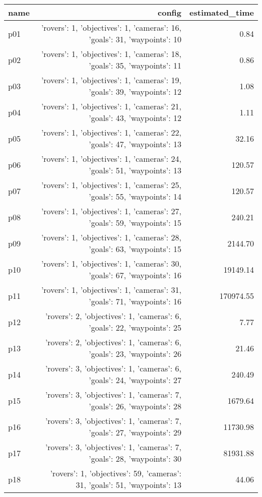 \documentclass{article}
\begin{document}
                            \begin{center}
                            \scriptsize
                            \begin{tabular}{@{}l|r|r@{}}
                            name & config & estimated\_time\\\midrule
                              p01&{'rovers': 1, 'objectives': 1, 'cameras': 16, 'goals': 31, 'waypoints': 10}&0.84\\
  p02&{'rovers': 1, 'objectives': 1, 'cameras': 18, 'goals': 35, 'waypoints': 11}&0.86\\
  p03&{'rovers': 1, 'objectives': 1, 'cameras': 19, 'goals': 39, 'waypoints': 12}&1.08\\
  p04&{'rovers': 1, 'objectives': 1, 'cameras': 21, 'goals': 43, 'waypoints': 12}&1.11\\
  p05&{'rovers': 1, 'objectives': 1, 'cameras': 22, 'goals': 47, 'waypoints': 13}&32.16\\
  p06&{'rovers': 1, 'objectives': 1, 'cameras': 24, 'goals': 51, 'waypoints': 13}&120.57\\
  p07&{'rovers': 1, 'objectives': 1, 'cameras': 25, 'goals': 55, 'waypoints': 14}&120.57\\
  p08&{'rovers': 1, 'objectives': 1, 'cameras': 27, 'goals': 59, 'waypoints': 15}&240.21\\
  p09&{'rovers': 1, 'objectives': 1, 'cameras': 28, 'goals': 63, 'waypoints': 15}&2144.70\\
  p10&{'rovers': 1, 'objectives': 1, 'cameras': 30, 'goals': 67, 'waypoints': 16}&19149.14\\
  p11&{'rovers': 1, 'objectives': 1, 'cameras': 31, 'goals': 71, 'waypoints': 16}&170974.55\\
  p12&{'rovers': 2, 'objectives': 1, 'cameras': 6, 'goals': 22, 'waypoints': 25}&7.77\\
  p13&{'rovers': 2, 'objectives': 1, 'cameras': 6, 'goals': 23, 'waypoints': 26}&21.46\\
  p14&{'rovers': 3, 'objectives': 1, 'cameras': 6, 'goals': 24, 'waypoints': 27}&240.49\\
  p15&{'rovers': 3, 'objectives': 1, 'cameras': 7, 'goals': 26, 'waypoints': 28}&1679.64\\
  p16&{'rovers': 3, 'objectives': 1, 'cameras': 7, 'goals': 27, 'waypoints': 29}&11730.98\\
  p17&{'rovers': 3, 'objectives': 1, 'cameras': 7, 'goals': 28, 'waypoints': 30}&81931.88\\
  p18&{'rovers': 1, 'objectives': 59, 'cameras': 31, 'goals': 51, 'waypoints': 13}&44.06\\

\end{tabular}
\end{center}
\end{document}
